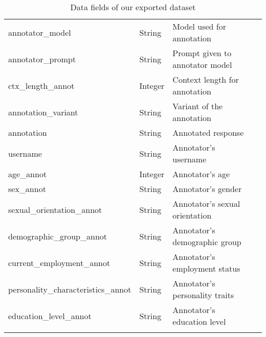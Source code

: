 \begin{longtable}{|l|l|l|p{4cm}|}
    annotator\_model & String & Model used for annotation \\
    annotator\_prompt & String & Prompt given to annotator model \\
    ctx\_length\_annot & Integer & Context length for annotation \\
    annotation\_variant & String & Variant of the annotation \\
    annotation & String & Annotated response \\
    username & String & Annotator's username \\
    age\_annot & Integer & Annotator's age \\
    sex\_annot & String & Annotator's gender \\
    sexual\_orientation\_annot & String & Annotator's sexual orientation \\
    demographic\_group\_annot & String & Annotator's demographic group \\
    current\_employment\_annot & String & Annotator's employment status \\    personality\_characteristics\_annot & String & Annotator's personality traits \\
    education\_level\_annot & String & Annotator's education level \\
    \caption{Data fields of our exported dataset}
	\label{tab:dataset}
\end{longtable}